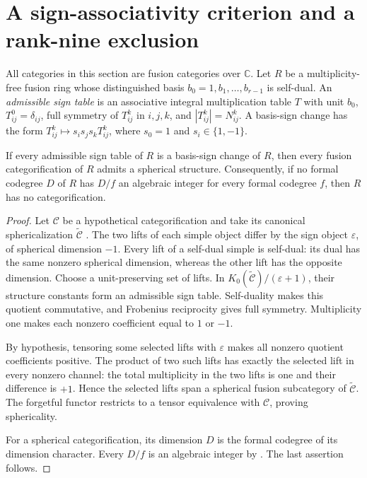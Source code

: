 \section{A sign-associativity criterion and a rank-nine exclusion}

All categories in this section are fusion categories over $\mathbb C$.
Let $R$ be a multiplicity-free fusion ring whose distinguished basis
$b_0=1,b_1,\ldots,b_{r-1}$ is self-dual. An \emph{admissible sign table}
is an associative integral multiplication table $T$ with unit $b_0$,
$T_{ij}^0=\delta_{ij}$, full symmetry of $T_{ij}^k$ in $i,j,k$, and
$|T_{ij}^k|=N_{ij}^k$. A basis-sign change has the form
$T_{ij}^k\mapsto s_i s_j s_k T_{ij}^k$, where $s_0=1$ and
$s_i\in\{1,-1\}$.

\begin{proposition}
If every admissible sign table of $R$ is a basis-sign change of $R$,
then every fusion categorification of $R$ admits a spherical structure.
Consequently, if no formal codegree $D$ of $R$ has $D/f$ an algebraic
integer for every formal codegree $f$, then $R$ has no categorification.
\end{proposition}
\begin{proof}
Let $\mathcal C$ be a hypothetical categorification and take its
canonical sphericalization $\widetilde{\mathcal C}$
\cite[Remark~3.1]{ENO}\cite[Section~5.1]{Ostrik3}.
The two lifts of each simple object differ by the sign object
$\varepsilon$, of spherical dimension $-1$. Every lift of a self-dual
simple is self-dual: its dual has the same nonzero spherical dimension,
whereas the other lift has the opposite dimension.
Choose a unit-preserving set of lifts. In
$K_0(\widetilde{\mathcal C})/(\varepsilon+1)$, their structure
constants form an admissible sign table. Self-duality makes this
quotient commutative, and Frobenius reciprocity gives full symmetry.
Multiplicity one makes each nonzero coefficient equal to $1$ or $-1$.

By hypothesis, tensoring some selected lifts with $\varepsilon$ makes
all nonzero quotient coefficients positive. The product of two such
lifts has exactly the selected lift in every nonzero channel: the
total multiplicity in the two lifts is one and their difference is
$+1$. Hence the selected lifts span a spherical fusion subcategory of
$\widetilde{\mathcal C}$. The forgetful functor restricts to a tensor
equivalence with $\mathcal C$, proving sphericality.

For a spherical categorification, its dimension $D$ is the formal
codegree of its dimension character. Every $D/f$ is an algebraic
integer by \cite[Theorem~2.13]{Ostrik3}. The last assertion follows.
\end{proof}

